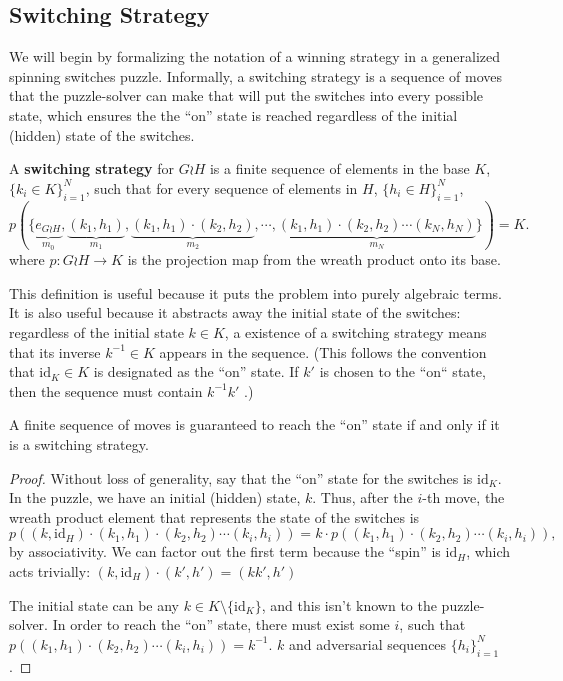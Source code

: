 \subsection{Switching Strategy}

We will begin by formalizing the notation of a winning strategy in a
generalized spinning switches puzzle. Informally, a switching strategy is
a sequence of moves that the puzzle-solver can make that will put the switches
into every possible state, which ensures the the ``on'' state is reached
regardless of the initial (hidden) state of the switches.

\begin{definition}
  A \textbf{switching strategy} for $G \wr H$ is a finite sequence of elements
  in the base $K$,
  $\{k_i \in K\}_{i=1}^N$,
  such that for every sequence of elements in $H$, ${\{h_i \in H\}_{i=1}^N}$,
  \[
    p(\{
      \underbrace{e_{G \wr H}}_{m_0},
      \underbrace{(k_1, h_1)}_{m_1},
      \underbrace{(k_1, h_1)\cdot(k_2, h_2)}_{m_2},
      \cdots,
      \underbrace{(k_1, h_1)\cdot(k_2, h_2)\cdots(k_N, h_N)}_{m_N}
    \}) = K.
  \]
  where $p \colon G \wr H \rightarrow K$ is the projection map from the
  wreath product onto its base.
\label{def:switchingStrategy}
\end{definition}

This definition is useful because it puts the problem into purely algebraic
terms. It is also useful because it abstracts away the initial state of the
switches: regardless of the initial state $k \in K$, a existence of a switching strategy
means that its inverse $k^{-1} \in K$ appears in the sequence.
(This follows the convention that $\mathrm{id}_K \in K$ is designated as the
``on'' state. If $k'$ is chosen to the ``on`` state, then the sequence
must contain $k^{-1}k'$ .)

\begin{proposition}
  A finite sequence of moves is guaranteed to reach the ``on''
  state if and only if it is a switching strategy.
\end{proposition}
\begin{proof}
  Without loss of generality, say that the ``on'' state for the switches is
  $\mathrm{id}_K$.
  In the puzzle, we have an initial (hidden) state, $k$.
  Thus, after the $i$-th move, the wreath product
  element that represents the state of the switches is \[
    p\left((k, \mathrm{id}_H)\cdot(k_1, h_1)\cdot(k_2, h_2)\cdots(k_i, h_i)\right)
    = k \cdot p\left((k_1, h_1)\cdot(k_2, h_2)\cdots(k_i, h_i)\right),
  \] by associativity. We can factor out the first term because
  the ``spin'' is $\mathrm{id}_H$, which acts trivially:
  ${(k, \mathrm{id}_H) \cdot (k', h') = (kk', h')}$

  The initial state can be any $k \in K \setminus \{\mathrm{id}_K\}$,
  and this isn't known to the puzzle-solver.
  In order to reach the ``on'' state, there must exist some $i$, such that
  $p\left((k_1, h_1)\cdot(k_2, h_2)\cdots(k_i, h_i)\right) = k^{-1}$.
  $k$ and adversarial sequences $\{h_i\}_{i=1}^N$.
\end{proof}

